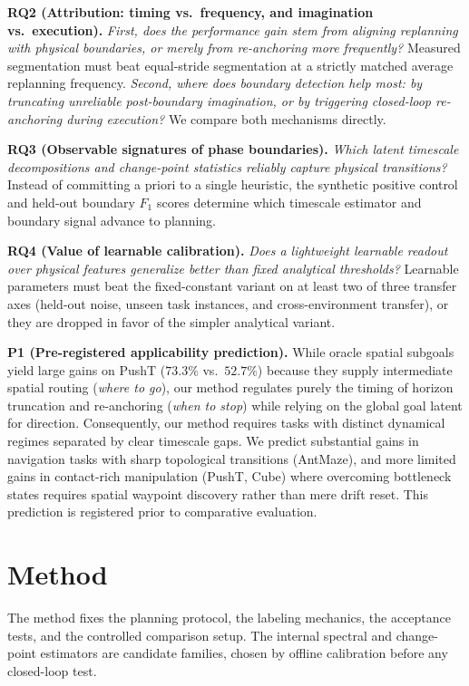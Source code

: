 \documentclass[11pt]{article}
\begin{document}
\textbf{RQ2 (Attribution: timing vs.\ frequency, and imagination vs.\ execution).} \textit{First, does the performance gain stem from aligning replanning with physical boundaries, or merely from re-anchoring more frequently?} Measured segmentation must beat equal-stride segmentation at a strictly matched average replanning frequency. \textit{Second, where does boundary detection help most: by truncating unreliable post-boundary imagination, or by triggering closed-loop re-anchoring during execution?} We compare both mechanisms directly.

\textbf{RQ3 (Observable signatures of phase boundaries).} \textit{Which latent timescale decompositions and change-point statistics reliably capture physical transitions?} Instead of committing a priori to a single heuristic, the synthetic positive control and held-out boundary $F_1$ scores determine which timescale estimator and boundary signal advance to planning.

\textbf{RQ4 (Value of learnable calibration).} \textit{Does a lightweight learnable readout over physical features generalize better than fixed analytical thresholds?} Learnable parameters must beat the fixed-constant variant on at least two of three transfer axes (held-out noise, unseen task instances, and cross-environment transfer), or they are dropped in favor of the simpler analytical variant.

\textbf{P1 (Pre-registered applicability prediction).} While oracle spatial subgoals yield large gains on PushT ($73.3\%$ vs.\ $52.7\%$) because they supply intermediate spatial routing (\textit{where to go}), our method regulates purely the timing of horizon truncation and re-anchoring (\textit{when to stop}) while relying on the global goal latent for direction. Consequently, our method requires tasks with distinct dynamical regimes separated by clear timescale gaps. We predict substantial gains in navigation tasks with sharp topological transitions (AntMaze), and more limited gains in contact-rich manipulation (PushT, Cube) where overcoming bottleneck states requires spatial waypoint discovery rather than mere drift reset. This prediction is registered prior to comparative evaluation.

\section{Method}

The method fixes the planning protocol, the labeling mechanics, the acceptance tests, and the controlled comparison setup. The internal spectral and change-point estimators are candidate families, chosen by offline calibration before any closed-loop test.
\end{document}
